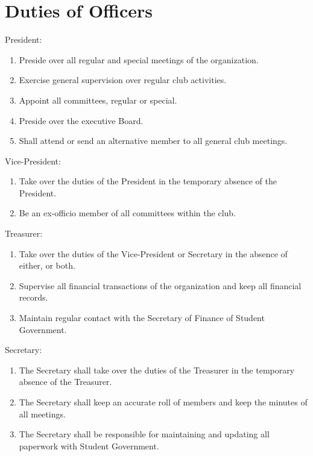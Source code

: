 \section{Duties of Officers}
\begin{subroutines}
\item President:
\begin{enumerate}
	\item Preside over all regular and special meetings of the organization.
	\item Exercise general supervision over regular club activities.
	\item Appoint all committees, regular or special.
	\item Preside over the executive Board.
	\item Shall attend or send an alternative member to all general club meetings.
\end{enumerate}
\item Vice-President:
\begin{enumerate}
	\item Take over the duties of the President in the temporary absence of the President.
	\item Be an ex-officio member of all committees within the club.
\end{enumerate}
\item Treasurer:
\begin{enumerate}
	\item Take over the duties of the Vice-President or Secretary in the absence of either, or both.
	\item Supervise all financial transactions of the organization and keep all financial records.
	\item Maintain regular contact with the Secretary of Finance of Student Government.
\end{enumerate}
\item Secretary:
\begin{enumerate}
	\item The Secretary shall take over the duties of the Treasurer in the temporary absence of the Treasurer.
	\item The Secretary shall keep an accurate roll of members and keep the minutes of all meetings.
	\item The Secretary shall be responsible for maintaining and updating all paperwork with Student Government.
\end{enumerate}
\end{subroutines}

